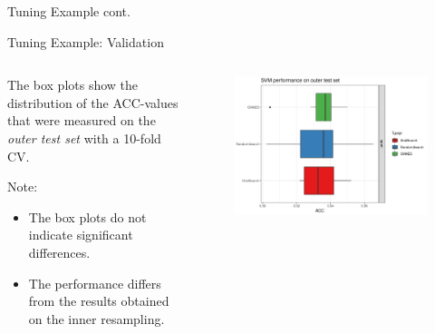 \begin{frame}{Tuning Example cont.}
\end{frame}

\begin{frame}{Tuning Example: Validation}

\begin{columns}
\begin{column}{0.4\textwidth}
  \footnotesize

  The box plots show the distribution of the ACC-values that were measured on the \emph{outer test set} with a 10-fold CV.

  Note:

  \begin{itemize}
    \item The box plots do not indicate significant differences.
    \item The performance differs from the results obtained on the inner resampling.
  \end{itemize}

\end{column}
\begin{column}{0.6\textwidth}
  \vspace{-1em}
  \begin{figure}
  \includegraphics[width=\textwidth]{images/benchmark_boxplot_tuners.png}
  \end{figure}
\end{column}
\end{columns}
\end{frame}

